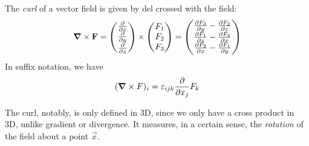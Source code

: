 \documentclass{../template/note}
\begin{document}
    \begin{definition*}
        The \emph{curl} of a vector field is given by del crossed with the field:
        \begin{align*}
            \curl \vec F = \begin{pmatrix}
             \pd{}{x} \\
             \pd{}{y} \\
             \pd{}{z} \\
            \end{pmatrix} \times \begin{pmatrix}
             F_1 \\
             F_2 \\
             F_3 \\
            \end{pmatrix} = \begin{pmatrix}
             \pd{F_3}{y} - \pd{F_2}{z} \\
             \pd{F_1}{z} - \pd{F_3}{x} \\
             \pd{F_2}{x} - \pd{F_1}{y} \\
            \end{pmatrix}
        \end{align*}
        In suffix notation, we have
        \begin{align*}
            (\curl F)_i = \lv{ijk} \pd{}{x_j} F_k
        \end{align*}
        
        
    \end{definition*}
    
    The curl, notably, is only defined in 3D, since we only have a cross product in 3D, unlike gradient or divergence. It measures, in a certain sense, the \emph{rotation} of the field about a point \(\vec x\).
\end{document}
